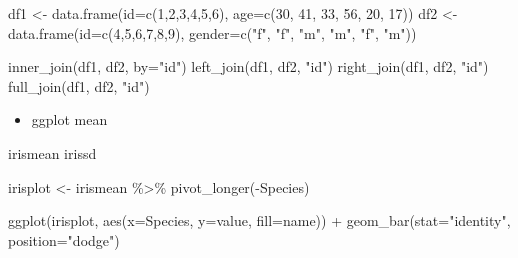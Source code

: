 \documentclass[
]{book}
\newenvironment{Shaded}{\begin{snugshade}}{\end{snugshade}}
\newcommand{\AttributeTok}[1]{\textcolor[rgb]{0.77,0.63,0.00}{#1}}
\newcommand{\DecValTok}[1]{\textcolor[rgb]{0.00,0.00,0.81}{#1}}
\newcommand{\FunctionTok}[1]{\textcolor[rgb]{0.00,0.00,0.00}{#1}}
\newcommand{\NormalTok}[1]{#1}
\newcommand{\OtherTok}[1]{\textcolor[rgb]{0.56,0.35,0.01}{#1}}
\newcommand{\SpecialCharTok}[1]{\textcolor[rgb]{0.00,0.00,0.00}{#1}}
\newcommand{\StringTok}[1]{\textcolor[rgb]{0.31,0.60,0.02}{#1}}
\providecommand{\tightlist}{%
  \setlength{\itemsep}{0pt}\setlength{\parskip}{0pt}}
\begin{document}
\begin{Shaded}
\begin{Highlighting}[]
\NormalTok{df1 }\OtherTok{\textless{}{-}} \FunctionTok{data.frame}\NormalTok{(}\AttributeTok{id=}\FunctionTok{c}\NormalTok{(}\DecValTok{1}\NormalTok{,}\DecValTok{2}\NormalTok{,}\DecValTok{3}\NormalTok{,}\DecValTok{4}\NormalTok{,}\DecValTok{5}\NormalTok{,}\DecValTok{6}\NormalTok{), }\AttributeTok{age=}\FunctionTok{c}\NormalTok{(}\DecValTok{30}\NormalTok{, }\DecValTok{41}\NormalTok{, }\DecValTok{33}\NormalTok{, }\DecValTok{56}\NormalTok{, }\DecValTok{20}\NormalTok{, }\DecValTok{17}\NormalTok{))}
\NormalTok{df2 }\OtherTok{\textless{}{-}} \FunctionTok{data.frame}\NormalTok{(}\AttributeTok{id=}\FunctionTok{c}\NormalTok{(}\DecValTok{4}\NormalTok{,}\DecValTok{5}\NormalTok{,}\DecValTok{6}\NormalTok{,}\DecValTok{7}\NormalTok{,}\DecValTok{8}\NormalTok{,}\DecValTok{9}\NormalTok{), }\AttributeTok{gender=}\FunctionTok{c}\NormalTok{(}\StringTok{"f"}\NormalTok{, }\StringTok{"f"}\NormalTok{, }\StringTok{"m"}\NormalTok{, }\StringTok{"m"}\NormalTok{, }\StringTok{"f"}\NormalTok{, }\StringTok{"m"}\NormalTok{))}

\FunctionTok{inner\_join}\NormalTok{(df1, df2, }\AttributeTok{by=}\StringTok{"id"}\NormalTok{)}
\FunctionTok{left\_join}\NormalTok{(df1, df2, }\StringTok{"id"}\NormalTok{)}
\FunctionTok{right\_join}\NormalTok{(df1, df2, }\StringTok{"id"}\NormalTok{)}
\FunctionTok{full\_join}\NormalTok{(df1, df2, }\StringTok{"id"}\NormalTok{)}
\end{Highlighting}
\end{Shaded}

\begin{itemize}
\tightlist
\item
  ggplot mean
\end{itemize}

\begin{Shaded}
\begin{Highlighting}[]
\NormalTok{irismean}
\NormalTok{irissd}

\NormalTok{irisplot }\OtherTok{\textless{}{-}}\NormalTok{ irismean }\SpecialCharTok{\%\textgreater{}\%} 
  \FunctionTok{pivot\_longer}\NormalTok{(}\SpecialCharTok{{-}}\NormalTok{Species)}

\FunctionTok{ggplot}\NormalTok{(irisplot, }\FunctionTok{aes}\NormalTok{(}\AttributeTok{x=}\NormalTok{Species, }\AttributeTok{y=}\NormalTok{value, }\AttributeTok{fill=}\NormalTok{name)) }\SpecialCharTok{+}
  \FunctionTok{geom\_bar}\NormalTok{(}\AttributeTok{stat=}\StringTok{"identity"}\NormalTok{, }\AttributeTok{position=}\StringTok{"dodge"}\NormalTok{) }
\end{Highlighting}
\end{Shaded}
\end{document}
